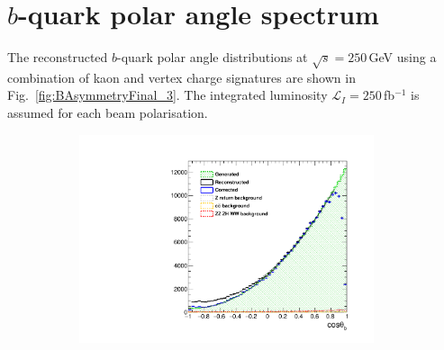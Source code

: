 \documentclass{PoS}
\begin{document}
\section{$b$-quark polar angle spectrum}

The reconstructed $b$-quark polar angle distributions at $\sqrt{s} = 250$\,GeV using a combination of kaon and vertex charge signatures are shown in Fig.~\ref{fig:BAsymmetryFinal_3}. The integrated luminosity $\mathcal{L}_I = 250$\,fb$^{-1}$ is assumed for each beam polarisation.


\begin{figure}
	\centering
	\begin{subfigure}{0.5\textwidth}
		\includegraphics[width=0.95\textwidth]{../ILD/plots/basymmetry-final-left.pdf}
\end{subfigure}
\end{figure}
\end{document}
